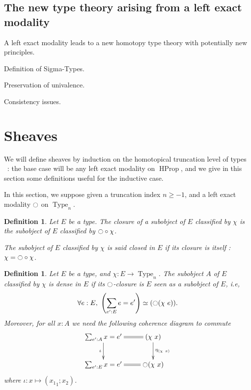 \documentclass[conference]{IEEEtran}
\newtheorem{defi}[thm]{Definition}
\newcommand{\ie}{i.e,\xspace}
\DeclareMathOperator{\Type}{Type}
\DeclareMathOperator{\HProp}{HProp}
\newcommand{\modal}{\ensuremath{\ocircle}}
\begin{document}
\subsection{The new type theory arising from a left exact modality}

A left exact modality leads to a new homotopy type theory with
potentially new principles. 

Definition of Sigma-Types. 

Preservation of univalence.

Consistency issues.


\section{Sheaves}
\label{sec:sheaves}

We will define sheaves by induction on the homotopical truncation level of types
~: the base case will be any left exact modality on $\HProp$, and we
give in this section some definitions useful for the inductive case.


In this section, we suppose given a truncation index $n\geqslant -1$,
and a left exact modality $\modal$ on $\Type_n$.

\begin{defi}
  Let $E$ be a type. The {\em closure} of a subobject of $E$ classified by $\chi$
  is the subobject of $E$ classified by $\modal \circ \chi$.

  The subobject of $E$ classified by $\chi$ is said {\em closed in
    $E$} if its closure is itself : $\chi = \modal \circ \chi$.
\end{defi}

\begin{defi}
  Let $E$ be a type, and $\chi:E \to \Type_n$. The subobject $A$ of $E$
  classified by $\chi$ is {\em dense} in $E$ if its $\modal$-closure
  is $E$ seen as a subobject of $E$, \ie
  $$\forall e:E,~ \left(\sum_{e':E} e=e'\right) \simeq (\modal (\chi~e)).$$ 
  Moreover, for all $x:A$ we need the following coherence diagram to
  commute
  $$\xymatrix{
    \sum_{e':A} x = e' \ar@{=}[r] \ar[d]_\iota & (\chi~x) \ar[d]^{\eta_{(\chi~x)}}\\
    \sum_{e':E} x = e' \ar@{=}[r] & \modal (\chi~x)
  }$$
  where $\iota: x \mapsto ({x_1}_1 ; x_2)$.
\end{defi}
\end{document}
